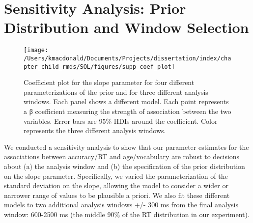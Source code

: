 \documentclass[oneside]{report}
\begin{document}
\hypertarget{sensitivity-analysis-prior-distribution-and-window-selection}{%
\section{Sensitivity Analysis: Prior Distribution and Window
Selection}\label{sensitivity-analysis-prior-distribution-and-window-selection}}
\begin{figure}[t]

{\centering \texttt{[image: /Users/kmacdonald/Documents/Projects/dissertation/index/chapter\_child\_rmds/SOL/figures/supp\_coef\_plot]} 

}

\caption[Results of sensitivity analysis for Experiment 1.1.]{Coefficient plot for the slope parameter for four different parameterizations of the prior and for three different analysis windows. Each panel shows a different model. Each point represents a β coefficient measuring the strength of association between the two variables. Error bars are 95\% HDIs around the coefficient. Color represents the three different analysis windows.}\label{fig:unnamed-chunk-9}
\end{figure}
We conducted a sensitivity analysis to show that our parameter estimates
for the associations between accuracy/RT and age/vocabulary are robust
to decisions about (a) the analysis window and (b) the specification of
the prior distribution on the slope parameter. Specifically, we varied
the parameterization of the standard deviation on the slope, allowing
the model to consider a wider or narrower range of values to be
plausible a priori. We also fit these different models to two additional
analysis windows +/- 300 ms from the final analysis window: 600-2500 ms
(the middle 90\% of the RT distribution in our experiment).
\end{document}
